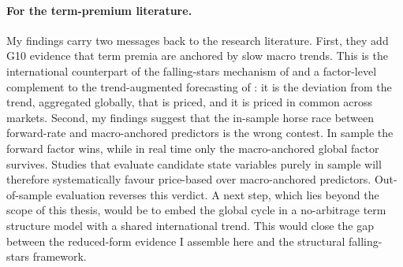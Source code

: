 \paragraph{For the term-premium literature.} My findings carry two
messages back to the research literature. First, they add G10 evidence that
term premia are anchored by slow macro trends. This is the international
counterpart of the falling-stars mechanism of \citet{bauer2020} and a
factor-level complement to the trend-augmented forecasting of
\citet{zhang2021}: it is the deviation from the trend, aggregated globally,
that is priced, and it is priced in common across markets. Second, my
findings suggest that the in-sample horse race between forward-rate and
macro-anchored predictors is the wrong contest. In sample the forward
factor wins, while in real time only the macro-anchored global factor
survives. Studies that evaluate candidate state variables purely in sample
will therefore systematically favour price-based over macro-anchored
predictors. Out-of-sample evaluation reverses this verdict. A next step, which lies
beyond the scope of this thesis, would be to embed the global cycle in a
no-arbitrage term structure model with a shared international trend. This
would close the gap between the reduced-form evidence I assemble here and
the structural falling-stars framework.
